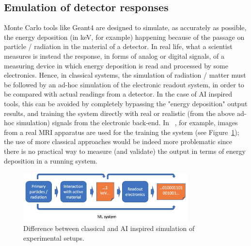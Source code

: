 \subsection{Emulation of detector responses}
Monte Carlo tools like Geant4 are designed to simulate, as accurately as possible, the energy deposition (in keV, for example) happening because of the passage on particle / radiation in the material of a detector. In real life, what a scientist measures is instead the response, in forms of analog or digital signals, of a measuring device in which energy deposition is read and processed by some electronics. Hence, in classical systems, the simulation of radiation / matter must be followed by an ad-hoc simulation of the electronic readout system, in order to be compared with actual readings from a detector. In the case of AI inspired tools, this can be avoided by completely bypassing the "energy deposition" output results, and training the system directly with real or realistic (from the above ad-hoc simulation) signals from the electronic back-end. In ~\cite{mri}, for example, images from a real MRI apparatus are used for the training the system (see Figure~\ref{fig:elec}); the use of more classical approaches would be indeed more problematic since there is no practical way to measure (and validate) the output in terms of energy deposition in a running system.
\begin{figure}[h]
    \centering

    \includegraphics[width=0.8\textwidth]{images/electronics.png}
    \caption{Difference between classical and AI inspired simulation of experimental setups.}
     \label{fig:elec}

\end{figure}

